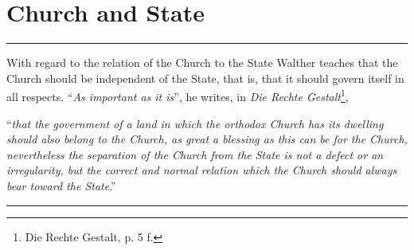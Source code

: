 \chapter{Church and State}

\hrule
\vspace{.30cm}
With regard to the relation of the Church to the State Walther teaches that the Church should be independent of the State, that is, that it should govern itself in all respects. ``\textit{As important as it is}”, he writes, in \textit{Die Rechte Gestalt}\footnote{Die Rechte Gestalt, p. 5 f.}, \begin{displayquote}“\textit{that the government of a land in which the orthodox Church has its dwelling should also belong to the Church, as great a blessing as this can be for the Church, nevertheless the separation of the Church from the State is not a defect or an irregularity, but the correct and normal relation which the Church should always bear toward the State}.”\end{displayquote}
\vspace{.30cm}
\hrule
\vspace{1.25cm}
